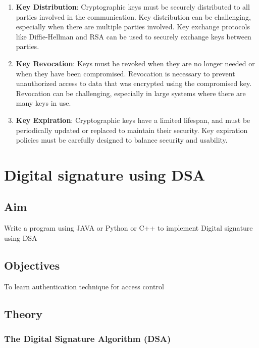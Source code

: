 \documentclass[openany]{book}
\begin{document}
\begin{enumerate}
\begin{enumerate}
              \item \textbf{Key Distribution}: Cryptographic keys must be securely distributed to all parties involved in the communication. Key distribution can be challenging, especially when there are multiple parties involved. Key exchange protocols like Diffie-Hellman and RSA can be used to securely exchange keys between parties.

              \item \textbf{Key Revocation}: Keys must be revoked when they are no longer needed or when they have been compromised. Revocation is necessary to prevent unauthorized access to data that was encrypted using the compromised key. Revocation can be challenging, especially in large systems where there are many keys in use.

              \item \textbf{Key Expiration}: Cryptographic keys have a limited lifespan, and must be periodically updated or replaced to maintain their security. Key expiration policies must be carefully designed to balance security and usability.

          \end{enumerate}

\end{enumerate}



\chapter{Digital signature using DSA}

\section{Aim}
Write a program using JAVA or Python or C++ to implement Digital signature using DSA

\section{Objectives}
To learn authentication technique for access control

\section{Theory}

\subsection{The Digital Signature Algorithm (DSA)}
\end{document}

